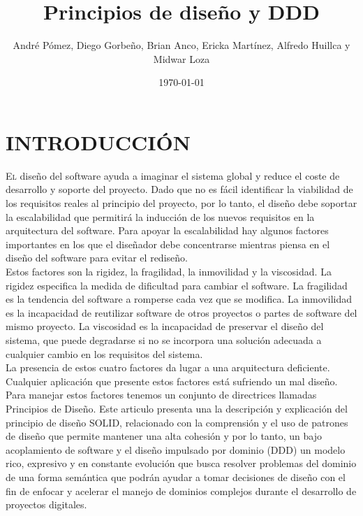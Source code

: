 \documentclass[11pt,letterpaper]{article}
\title{Principios de diseño y DDD}
\author{André Pómez, Diego Gorbeño, Brian Anco, Ericka Martínez, Alfredo Huillca y Midwar Loza }
\date{\today}
\begin{document}
\maketitle


\section{INTRODUCCIÓN}
\lettrine[nindent=0em,lines=3]{E}
l diseño del software ayuda a imaginar el sistema global y reduce el coste de desarrollo y soporte del proyecto. Dado que no es fácil identificar la viabilidad de los requisitos reales al principio del proyecto, por lo tanto, el diseño debe soportar la escalabilidad que permitirá la inducción de los nuevos requisitos en la arquitectura del software. Para apoyar la escalabilidad hay algunos factores importantes en los que el diseñador debe concentrarse mientras piensa en el diseño del software para evitar el rediseño.\\
Estos factores son la rigidez, la fragilidad, la inmovilidad y la viscosidad. La rigidez especifica la medida de dificultad para cambiar el software. La fragilidad es la tendencia del software a romperse cada vez que se modifica. La inmovilidad es la incapacidad de reutilizar software de otros proyectos o partes de software del mismo proyecto. La viscosidad es la incapacidad de preservar el diseño del sistema, que puede degradarse si no se incorpora una solución adecuada a cualquier cambio en los requisitos del sistema.\\
La presencia de estos cuatro factores da lugar a una arquitectura deficiente. Cualquier aplicación que presente estos factores está sufriendo un mal diseño. Para manejar estos factores tenemos un conjunto de directrices llamadas Principios de Diseño. Este articulo presenta una la descripción y explicación del principio de diseño SOLID, relacionado con la comprensión y el uso de patrones de diseño que permite mantener una alta cohesión y por lo tanto, un bajo acoplamiento de software y el diseño impulsado por dominio (DDD) un modelo rico, expresivo y en constante evolución que busca resolver problemas del dominio de una forma semántica que podrán ayudar a tomar decisiones de diseño con el fin de enfocar y acelerar el manejo de dominios complejos durante el desarrollo de proyectos digitales. 
\\\\
\end{document}
